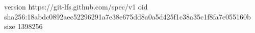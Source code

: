 version https://git-lfs.github.com/spec/v1
oid sha256:18abdc0892aec52296291a7e38e675dd8a0a5d425f1c38a35c1f8fa7c055160b
size 1398256
